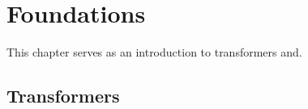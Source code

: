 \chapter{Foundations}
This chapter serves as an introduction to transformers and.

\section{Transformers}
\cite{Kim2021}